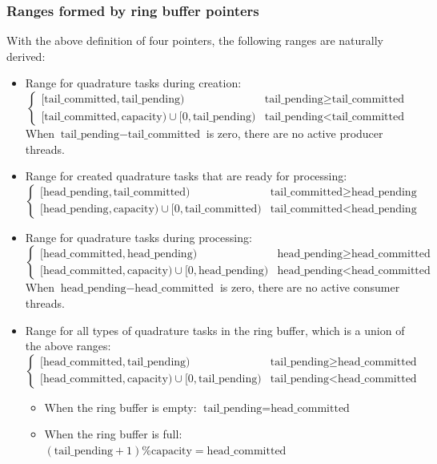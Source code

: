 \documentclass[11pt, a4paper]{book}
\begin{document}
\subsubsection{Ranges formed by ring buffer pointers}

With the above definition of four pointers, the following ranges are naturally derived:
\begin{itemize}
\item Range for quadrature tasks during creation:
  $$
  \begin{cases}
    [\text{tail\_committed}, \text{tail\_pending}) & \text{tail\_pending} \geq
    \text{tail\_committed} \\
    [\text{tail\_committed}, \text{capacity}) \cup [0, \text{tail\_pending}) &
    \text{tail\_pending} < \text{tail\_committed}
  \end{cases}
  $$
  When $\text{tail\_pending} - \text{tail\_committed}$ is zero, there are no active
  producer threads.
\item Range for created quadrature tasks that are ready for processing:
  $$
  \begin{cases}
    [\text{head\_pending}, \text{tail\_committed}) & \text{tail\_committed} \geq
    \text{head\_pending} \\
    [\text{head\_pending}, \text{capacity}) \cup [0, \text{tail\_committed}) &
    \text{tail\_committed} < \text{head\_pending}
  \end{cases}
  $$
\item Range for quadrature tasks during processing:
  $$
  \begin{cases}
    [\text{head\_committed}, \text{head\_pending}) & \text{head\_pending} \geq
    \text{head\_committed} \\
    [\text{head\_committed}, \text{capacity}) \cup [0, \text{head\_pending}) &
    \text{head\_pending} < \text{head\_committed}
  \end{cases}
  $$
  When $\text{head\_pending} - \text{head\_committed}$ is zero, there are no active
  consumer threads.
\item Range for all types of quadrature tasks in the ring buffer, which is a union of the
  above ranges:
  $$
  \begin{cases}
    [\text{head\_committed}, \text{tail\_pending}) & \text{tail\_pending} \geq
    \text{head\_committed} \\
    [\text{head\_committed}, \text{capacity}) \cup [0, \text{tail\_pending}) &
    \text{tail\_pending} < \text{head\_committed}
  \end{cases}
  $$
  \begin{itemize}
  \item When the ring buffer is empty: $\text{tail\_pending} = \text{head\_committed}$
  \item When the ring buffer is full:
    $(\text{tail\_pending} + 1) \% \text{capacity} = \text{head\_committed}$
  \end{itemize}
\end{itemize}
\end{document}
